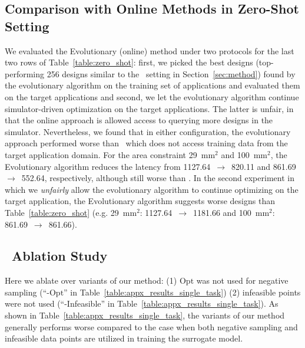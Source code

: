 \subsection{Comparison with Online Methods in Zero-Shot Setting}
\label{sec:app_zero_shot}
%
We evaluated the Evolutionary (online) method under two protocols for the last two rows of Table~\ref{table:zero_shot}: first, we picked the best designs (top-performing 256 designs similar to the \primemethodname\ setting in Section~\ref{sec:method}) found by the evolutionary algorithm on the training set of applications and evaluated them on the target applications and second, we let the evolutionary algorithm continue simulator-driven optimization on the target applications.
%
The latter is unfair, in that the online approach is allowed access to querying more designs in the simulator. Nevertheless, we found that in either configuration, the evolutionary approach performed worse than \primemethodname\, which does not access training data from the target application domain.
%
For the area constraint 29~mm$^2$ and 100~mm$^2$, the Evolutionary algorithm reduces the latency from 1127.64~$\rightarrow$~820.11 and 861.69~$\rightarrow$~552.64, respectively, although still worse than \primemethodname.
%
In the second experiment in which we \emph{unfairly} allow the evolutionary algorithm to continue optimizing on the target application, the Evolutionary algorithm suggests worse designs than Table~\ref{table:zero_shot} (e.g. 29~mm$^2$: 1127.64~$\rightarrow$~1181.66 and 100~mm$^2$: 861.69~$\rightarrow$~861.66).
%
\subsection{\primemethodname\ Ablation Study}
\label{sec:appx_ablation}

Here we ablate over variants of our method: (1) $\mathrm{Opt}$ was not used for negative sampling (``\primemethodname-$\mathrm{Opt}$'' in Table~\ref{table:appx_results_single_task}) (2)  infeasible points were not used (``\primemethodname-Infeasible'' in Table~\ref{table:appx_results_single_task}).
%
As shown in Table~\ref{table:appx_results_single_task}, the variants of our method generally performs worse compared to the case when both negative sampling and infeasible data points are utilized in training the surrogate model.

